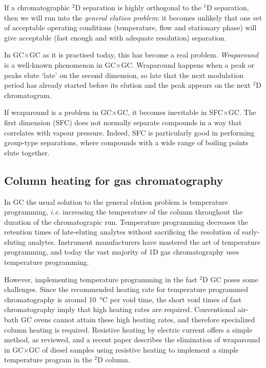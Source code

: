 \documentclass[aip,rsi,preprint,graphicx]{revtex4-1} %
\begin{document}
If a chromatographic $^2$D separation is highly orthogonal to the $^1$D
separation, then we will run into the \textit{general elution
problem}\cite{Skoog2007}: it becomes unlikely that one set of acceptable
operating conditions (temperature, flow and stationary phase) will give
acceptable (fast enough and with adequate resolution) separation.

In GC×GC as it is practised today, this has become a real problem.
\textit{Wraparound} is a well-known phenomenon in
GC×GC\cite{Dalluege2003}. Wraparound happens when a peak or peaks elute
`late' on the second dimension, so late that the next modulation period has
already started before its elution and the peak appears on the next $^2$D
chromatogram.


If wraparound is a problem in GC×GC, it becomes inevitable in
SFC×GC. The first dimension (SFC) does not normally separate compounds in
a way that correlates with vapour pressure. Indeed, SFC is particularly good in
performing group-type separations\cite{Venter1999}, where compounds with a wide
range of boiling points elute together.

\subsection{Column heating for gas chromatography}

In GC the usual solution to the general elution problem is temperature
programming, \textit{i.e.} increasing the temperature of the column throughout
the duration of the chromatograpic run. Temperature programming decreases the
retention times of late-eluting analytes without sacrificing the resolution of
early-eluting analytes. Instrument manufacturers have mastered the art of
temperature programming, and today the vast majority of 1D gas chromatography
uses temperature programming.

However, implementing temperature programming in the fast $^2$D GC poses some
challenges. Since the recommended heating rate for temperature programmed
chromatography is around \SI{10}{\celsius} per void time\cite{Blumberg2000}, the
short void times of fast chromatography imply that high heating rates are
required. Conventional air-bath GC ovens cannot attain these high heating rates,
and therefore specialized column heating is required. Resistive heating by
electric current offers a simple method, as reviewed\cite*{Wang2012,Jacobs2013},
and a recent paper\cite{Chow2017} describes the elimination of wraparound in
GC×GC of diesel samples using resistive heating to implement a simple
temperature program in the $^2$D column.
\end{document}
